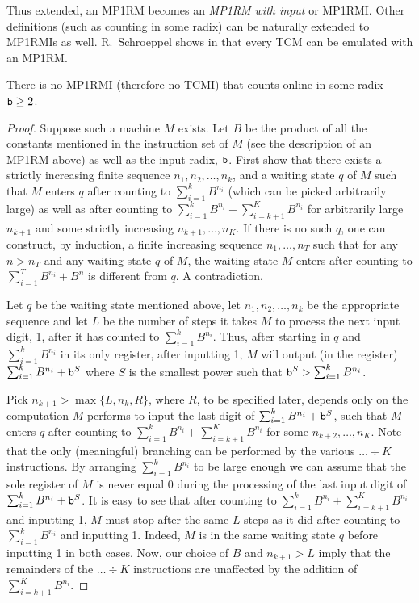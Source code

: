 \documentclass[12pt]{article}
\begin{document}
Thus extended, an MP1RM becomes an
{\it MP1RM with input\/} or MP1RMI. Other definitions (such as counting
in some radix) can be naturally extended to MP1RMIs as
well. R.~Schroeppel shows in \cite{Schroep} that every TCM can be
emulated with an MP1RM.
\begin{theorem}\label{tcexact}
There is no MP1RMI (therefore no TCMI) that counts online in some
radix ${\tt b}\geq2$.
\end{theorem}
\begin{proof}
Suppose such a machine $M$ exists. Let $B$ be the product of all the
constants mentioned in the instruction set of $M$
(see the description of an MP1RM above) as well as the input radix, ${\tt b}$. 
First show that there exists a strictly
increasing finite sequence $n_1, n_2,\ldots, n_k$, and a waiting state $q$ of
$M$ such that $M$ enters $q$ after counting to $\sum_{i=1}^kB^{n_i}$
(which can be picked arbitrarily large) as
well as after counting to $\sum_{i=1}^kB^{n_i}+\sum_{i=k+1}^{K}B^{n_i}$ for arbitrarily
large $n_{k+1}$ and some strictly increasing $n_{k+1},\ldots,n_K$. If
there is no such $q$, one can construct, by induction, a finite
increasing sequence $n_1,\ldots,n_T$ such that for any $n>n_T$ and any
waiting state $q$ of $M$, the waiting state $M$ enters after counting
to $\sum_{i=1}^TB^{n_i}+B^n$ is different from $q$. A contradiction. 

Let $q$ be the waiting state mentioned above, let $n_1,n_2,\ldots,n_k$ 
be the appropriate sequence and let $L$ be the number of steps
it takes $M$ to process the next input digit, 1, after it has counted to
$\sum_{i=1}^kB^{n_i}$. Thus, after starting in $q$ and
$\sum_{i=1}^kB^{n_i}$ in its only register, after inputting 1, $M$
will output (in the register) $\sum_{i=1}^kB^{n_i}+{\tt b}^S$ where $S$ is
the smallest power such that ${\tt b}^S>\sum_{i=1}^kB^{n_i}$.

Pick $n_{k+1}>\max\{L,n_k,R\}$, where $R$, to
be specified later,
depends only on the computation $M$ performs to input the last digit
of $\sum_{i=1}^kB^{n_i}+{\tt b}^S$, such that $M$
enters $q$ after counting to $\sum_{i=1}^kB^{n_i}+\sum_{i=k+1}^{K}B^{n_i}$
for some $n_{k+2},\ldots,n_K$. Note that the only (meaningful) 
branching can be performed by the various $\ldots\div K$ instructions. By
arranging $\sum_{i=1}^kB^{n_i}$ to be large enough we can assume that the
sole register of $M$ is never equal 0 during the processing of the
last input digit of
$\sum_{i=1}^kB^{n_i}+{\tt b}^S$. It is easy to see that after counting to
$\sum_{i=1}^kB^{n_i}+\sum_{i=k+1}^{K}B^{n_i}$ and inputting 1, $M$ must
stop after the same $L$ steps as it did after counting to
$\sum_{i=1}^kB^{n_i}$ and inputting 1. Indeed, $M$ is in the same
waiting state $q$ before inputting 1 in both cases. Now, our choice of $B$ and
$n_{k+1}>L$ imply that the remainders of the $\ldots\div K$
instructions are unaffected by the addition of $\sum_{i=k+1}^{K}B^{n_i}$.


\end{proof}
\end{document}
